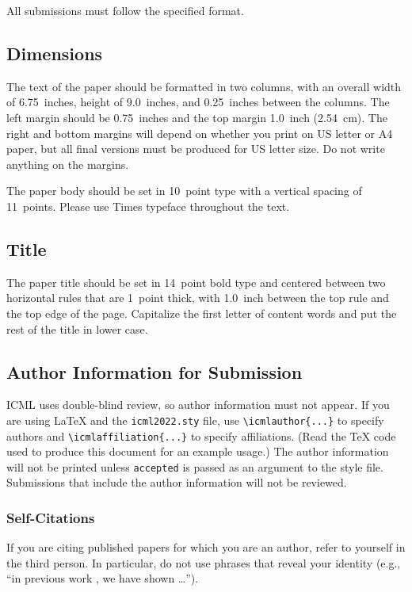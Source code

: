 \documentclass[nohyperref]{article}
\theoremstyle{plain}
\theoremstyle{definition}
\theoremstyle{remark}
\begin{document}
All submissions must follow the specified format.

\subsection{Dimensions}




The text of the paper should be formatted in two columns, with an
overall width of 6.75~inches, height of 9.0~inches, and 0.25~inches
between the columns. The left margin should be 0.75~inches and the top
margin 1.0~inch (2.54~cm). The right and bottom margins will depend on
whether you print on US letter or A4 paper, but all final versions
must be produced for US letter size.
Do not write anything on the margins.

The paper body should be set in 10~point type with a vertical spacing
of 11~points. Please use Times typeface throughout the text.

\subsection{Title}

The paper title should be set in 14~point bold type and centered
between two horizontal rules that are 1~point thick, with 1.0~inch
between the top rule and the top edge of the page. Capitalize the
first letter of content words and put the rest of the title in lower
case.

\subsection{Author Information for Submission}
\label{author info}

ICML uses double-blind review, so author information must not appear. If
you are using \LaTeX\/ and the \texttt{icml2022.sty} file, use
\verb+\icmlauthor{...}+ to specify authors and \verb+\icmlaffiliation{...}+ to specify affiliations. (Read the TeX code used to produce this document for an example usage.) The author information
will not be printed unless \texttt{accepted} is passed as an argument to the
style file.
Submissions that include the author information will not
be reviewed.

\subsubsection{Self-Citations}

If you are citing published papers for which you are an author, refer
to yourself in the third person. In particular, do not use phrases
that reveal your identity (e.g., ``in previous work \cite{langley00}, we
have shown \ldots'').
\end{document}
